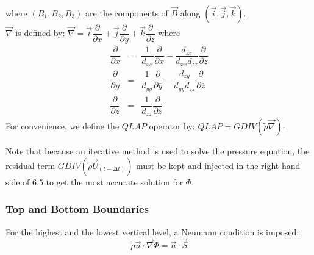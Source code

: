 where $(B_1, B_2, B_3)$ are the components of $\vec{B}$ along
$\left( \vec{i}, \vec{j}, \vec{k} \right)$.\\
$\overrightarrow{\nabla}$ is defined by:
$
\overrightarrow{\nabla}=
\vec{i} \dfrac {\partial{  } } {\partial{x} }  +
\vec{j} \dfrac {\partial{  } } {\partial{y} }  +
\vec{k} \dfrac {\partial{  } } {\partial{z} }
$
where
\begin{eqnarray*}
\dfrac {\partial{  } } {\partial{x} } &=&
\dfrac{1}{d_{xx}}
  \dfrac{\partial  }{\partial \overline{x}}- \dfrac{d_{zx}}{d_{xx}d_{zz}}
\dfrac{\partial  }{\partial \overline{z}}\\
\dfrac {\partial{  } } {\partial{y} } &=&
\dfrac{1}{d_{yy}}
  \dfrac{\partial  }{\partial \overline{y}}- \dfrac{d_{zy}}{d_{yy}d_{zz}}
   \dfrac{\partial  }{\partial \overline{z}}\\
\dfrac {\partial{  } } {\partial{z} } &=&
\dfrac{1}{d_{zz}}
  \dfrac{\partial  }{\partial \overline{z}}
\end{eqnarray*}
For convenience, we define the $QLAP$ operator by: $QLAP =
GDIV(\tilde{\rho} \overrightarrow{\nabla})$.

Note that because an iterative method is used to solve the pressure equation,
the residual term $GDIV(\tilde{\rho} \vec{U}_{(t-\Delta t)})$
must be kept and injected in the right hand side
of 6.5 to get the most accurate solution for $\Phi$.
\subsubsection{Top and Bottom Boundaries}
For the highest and the lowest vertical level, a Neumann condition is
imposed:\\
\begin{equation}
\label{vb1}
\tilde{\rho} \vec{n} \cdot \overrightarrow{\nabla}\Phi= \vec{n} \cdot
\overrightarrow{S}
\end{equation}
